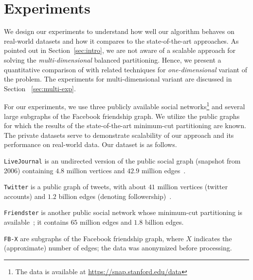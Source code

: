 \section{Experiments}\label{sec:experiments}
We design our experiments to understand how well our algorithm behaves on real-world datasets and how
it compares to the state-of-the-art approaches. As pointed out in Section~\ref{sec:intro}, we are not
aware of a scalable approach for solving the {\it multi-dimensional} balanced partitioning. Hence, 
we present a quantitative comparison of \algnameshort with related techniques for {\it one-dimensional} variant
of the problem. The experiments for multi-dimensional variant are discussed in Section ~\ref{sec:multi-exp}.

For our experiments, we use three publicly available social networks\footnote{The data is available at \url{https://snap.stanford.edu/data}} 
and several large subgraphs of the Facebook friendship graph. We utilize the public graphs for which the results of the state-of-the-art minimum-cut partitioning are known. The private datasets serve to demonstrate scalability of our approach and its performance on real-world data. Our dataset is as follows.

\begin{compactitem}
    \item \texttt{LiveJournal} is an undirected version of the public social graph (snapshot from 2006) containing $4.8$ million vertices and $42.9$ million edges~\cite{UB13}.

    \item \texttt{Twitter} is a public graph of tweets, with about $41$ million vertices (twitter accounts) and $1.2$ billion 
    edges (denoting followership)~\cite{Kwak10}.

    \item \texttt{Friendster} is another public social network whose minimum-cut partitioning is 
    available~\cite{ABM16}; it contains $65$ million edges and $1.8$ billion edges.

  \item \texttt{FB-X} are subgraphs of the Facebook friendship graph, where $X$ indicates the (approximate) number of edges; the data was anonymized before processing.
\end{compactitem}

